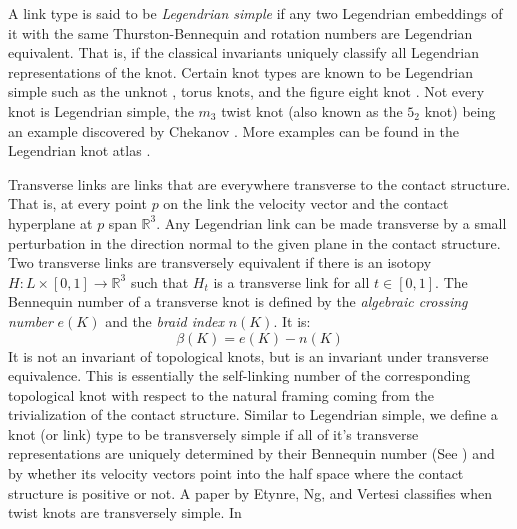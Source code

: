 \documentclass{article}
\theoremstyle{plain}
\begin{document}
        A link type is said to be \textit{Legendrian simple} if
        any two Legendrian embeddings of it with the same Thurston-Bennequin
        and rotation numbers are Legendrian equivalent. That is, if the classical
        invariants uniquely classify all Legendrian representations of the knot.
        Certain knot types are known to be Legendrian simple such as the unknot
        \cite{EliashbergFraserClassificationTopTrivialLegKnots}, torus knots,
        and the figure eight knot \cite{EtnyreHondaContactTopologyI}.
        Not every knot is Legendrian simple, the $m_{3}$ twist knot (also
        known as the $5_{2}$ knot) being an example discovered by Chekanov
        \cite{ChekanovDifAlgOfLegLinks}. More examples can be found in the
        Legendrian knot atlas \cite{LegendrianKnotAtlas}.
        \par\hfill\par
        Transverse links are links that are everywhere transverse to the
        contact structure. That is, at every point $p$ on the link the velocity
        vector and the contact hyperplane at $p$ span $\mathbb{R}^{3}$. Any Legendrian
        link can be made transverse by a small perturbation in the direction
        normal to the given plane in the contact structure.
        Two transverse links are transversely equivalent if there is an
        isotopy $H:L\times[0,1]\rightarrow\mathbb{R}^{3}$ such that $H_{t}$ is a
        transverse link for all $t\in[0,1]$. The Bennequin number of a
        transverse knot is defined by the \textit{algebraic crossing number}
        $e(K)$ and the \textit{braid index} $n(K)$. It is:
        \begin{equation}
            \beta(K)=e(K)-n(K)
        \end{equation}
        It is not an invariant of topological knots, but is an invariant under
        transverse equivalence. This is essentially the self-linking number of
        the corresponding topological knot with respect to the natural framing
        coming from the trivialization of the contact structure.
        Similar to Legendrian simple, we define a knot
        (or link) type to be transversely simple if all of it's transverse
        representations are uniquely determined by their Bennequin number
        (See \cite{BirmanWrinkleTransversallySimpleKnots}) and by whether its
        velocity vectors point into the half space where the contact structure
        is positive or not. A paper by Etynre, Ng, and Vertesi
        \cite{EtnyreEtAlLegendrianAndTransverseTwistKnots}
        classifies when twist knots are transversely simple. In
\end{document}
